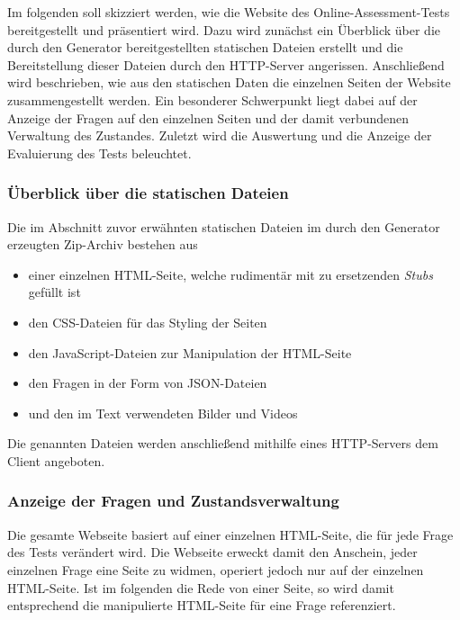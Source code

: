 \label{Jena}

Im folgenden soll skizziert werden, wie die Website des Online-Assessment-Tests bereitgestellt und präsentiert wird. Dazu wird zunächst ein Überblick über die durch den Generator bereitgestellten statischen Dateien erstellt und die Bereitstellung dieser Dateien durch den HTTP-Server angerissen. Anschließend wird beschrieben, wie aus den statischen Daten die einzelnen Seiten der Website zusammengestellt werden. Ein besonderer Schwerpunkt liegt dabei auf der Anzeige der Fragen auf den einzelnen Seiten und der damit verbundenen Verwaltung des Zustandes. Zuletzt wird die Auswertung und die Anzeige der Evaluierung des Tests beleuchtet.

\subsubsection{Überblick über die statischen Dateien}

Die im Abschnitt zuvor erwähnten statischen Dateien im durch den Generator erzeugten Zip-Archiv bestehen aus

\begin{itemize}
\item einer einzelnen HTML-Seite, welche rudimentär mit zu ersetzenden \textit{Stubs} gefüllt ist

\item den CSS-Dateien für das Styling der Seiten

\item den JavaScript-Dateien zur Manipulation der HTML-Seite 

\item den Fragen in der Form von JSON-Dateien

\item und den im Text verwendeten Bilder und Videos
\end{itemize}

Die genannten Dateien werden anschließend mithilfe eines HTTP-Servers dem Client angeboten. 

\subsubsection{Anzeige der Fragen und Zustandsverwaltung}

Die gesamte Webseite basiert auf einer einzelnen HTML-Seite, die für jede Frage des Tests verändert wird. Die Webseite erweckt damit den Anschein, jeder einzelnen Frage eine Seite zu widmen, operiert jedoch nur auf der einzelnen HTML-Seite. Ist im folgenden die Rede von einer Seite, so wird damit entsprechend die manipulierte HTML-Seite für eine Frage referenziert.

